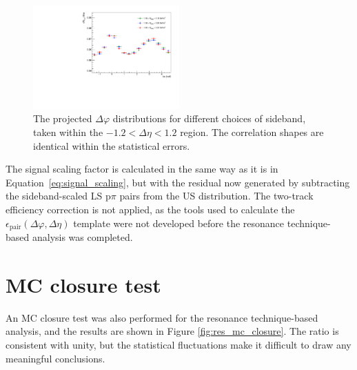 \begin{figure}[ht]
    \centering
    \includegraphics[width=0.5\textwidth]{figures/analysis/h_lambda_dphi_rsbcomp_0_20.pdf}
    \caption{The projected $\Delta\varphi$ distributions for different choices of sideband, taken within the $-1.2 < \Delta\eta < 1.2$ region. The correlation shapes are identical within the statistical errors.}
    \label{fig:res_sideband_comp}
\end{figure}

The signal scaling factor is calculated in the same way as it is in Equation~\ref{eq:signal_scaling}, but with the residual now generated by subtracting the sideband-scaled LS p$\pi$ pairs from the US distribution. The two-track efficiency correction is not applied, as the tools used to calculate the $\epsilon_{\text{pair}}(\Delta\varphi, \Delta\eta)$ template were not developed before the resonance technique-based analysis was completed.

\section{MC closure test}
\label{sec:res_mc_closure}

An MC closure test was also performed for the resonance technique-based analysis, and the results are shown in Figure \ref{fig:res_mc_closure}. The ratio is consistent with unity, but the statistical fluctuations make it difficult to draw any meaningful conclusions. 

